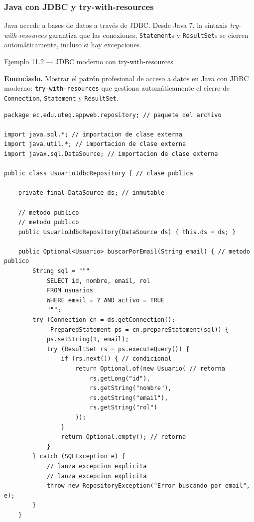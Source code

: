 \subsubsection{Java con JDBC y try-with-resources}

Java accede a bases de datos a través de JDBC. Desde Java 7,
la sintaxis \emph{try-with-resources} garantiza que las conexiones,
\texttt{Statement}s y \texttt{ResultSet}s se cierren automáticamente,
incluso si hay excepciones.


\begin{cajaejemplo}{Ejemplo 11.2 --- JDBC moderno con try-with-resources}

\textbf{Enunciado.} Mostrar el patrón profesional de acceso a datos en Java con JDBC moderno: \texttt{try-with-resources} que gestiona automáticamente el cierre de \texttt{Connection}, \texttt{Statement} y \texttt{ResultSet}.

\begin{lstlisting}[style=java,caption={UsuarioJdbcRepository.java},label=lst:11.5]
package ec.edu.uteq.appweb.repository; // paquete del archivo

import java.sql.*; // importacion de clase externa
import java.util.*; // importacion de clase externa
import javax.sql.DataSource; // importacion de clase externa

public class UsuarioJdbcRepository { // clase publica

    private final DataSource ds; // inmutable

    // metodo publico
    // metodo publico
    public UsuarioJdbcRepository(DataSource ds) { this.ds = ds; }

    public Optional<Usuario> buscarPorEmail(String email) { // metodo publico
        String sql = """
            SELECT id, nombre, email, rol
            FROM usuarios
            WHERE email = ? AND activo = TRUE
            """;
        try (Connection cn = ds.getConnection();
             PreparedStatement ps = cn.prepareStatement(sql)) {
            ps.setString(1, email);
            try (ResultSet rs = ps.executeQuery()) {
                if (rs.next()) { // condicional
                    return Optional.of(new Usuario( // retorna
                        rs.getLong("id"),
                        rs.getString("nombre"),
                        rs.getString("email"),
                        rs.getString("rol")
                    ));
                }
                return Optional.empty(); // retorna
            }
        } catch (SQLException e) {
            // lanza excepcion explicita
            // lanza excepcion explicita
            throw new RepositoryException("Error buscando por email", e);
        }
    }


\end{lstlisting}
\end{cajaejemplo}
